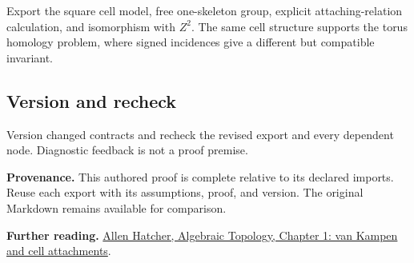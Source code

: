 \documentclass[preprint,12pt,aps,pra,showkeys,amsmath,amssymb,superscriptaddress,floatfix]{revtex4-2}
\theoremstyle{definition}
\theoremstyle{remark}
\begin{document}
Export the square cell model, free one-skeleton group, explicit
attaching-relation calculation, and isomorphism with \(Z^{2}\). The same
cell structure supports the torus homology problem, where signed
incidences give a different but compatible invariant.

\subsection{Version and recheck}
Version changed contracts and recheck the revised export and every
dependent node. Diagnostic feedback is not a proof premise.

\par\medskip\begingroup\footnotesize\linespread{1.0}\selectfont\noindent\textbf{Provenance.} This authored proof is complete relative to its declared imports. Reuse
each export with its assumptions, proof, and version. The original
Markdown remains available for comparison.
\par\endgroup

\par\smallskip\begingroup\footnotesize\linespread{1.0}\selectfont\noindent\textbf{Further reading.} \href{https://pi.math.cornell.edu/~hatcher/AT/ATchapters.html}{Allen
Hatcher, Algebraic Topology, Chapter 1: van Kampen and cell
attachments}.\par\endgroup
\end{document}
